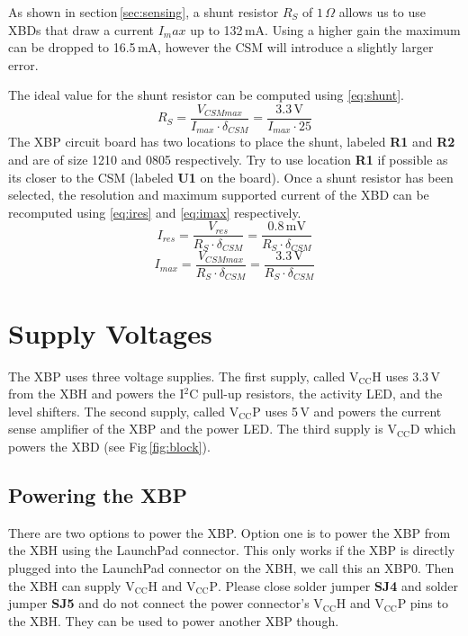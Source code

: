 \documentclass[twoside,11pt]{cergdoc}
\begin{document}
As shown in section\,\ref{sec:sensing}, a shunt resistor $R_S$ of $1\,\Omega$
allows us to use XBDs that draw a current $I_max$ up to 132\,mA. Using a higher 
gain the maximum can be dropped to 16.5\,mA, however the CSM will introduce a 
slightly larger error. 

The ideal value for the shunt resistor can be computed using \eqref{eq:shunt}.
%
\begin{equation}
  R_S = \frac{V_{CSMmax}}{I_{max} \cdot \delta_{CSM}} = \frac{3.3\,\mathrm{V}}{I_{max} \cdot 25}\label{eq:shunt}
\end{equation}
%
The XBP circuit board has two locations to place the shunt, labeled \textbf{R1} 
and \textbf{R2} and are of size 1210 and 0805 respectively. Try to use location 
\textbf{R1} if possible as its closer to the CSM (labeled \textbf{U1} on the board).
Once a shunt resistor has been selected, the resolution and maximum supported current of the XBD can be
recomputed using \eqref{eq:ires} and \eqref{eq:imax} respectively. 
%
\begin{equation}
  I_{res} = \frac{V_{res}}{R_S \cdot \delta_{CSM}} = \frac{0.8\,\mathrm{mV}}{R_S \cdot \delta_{CSM}}\label{eq:ires}
\end{equation}
\begin{equation}
  I_{max} = \frac{V_{CSMmax}}{R_S \cdot \delta_{CSM}} = \frac{3.3\,\mathrm{V}}{R_S \cdot \delta_{CSM}}\label{eq:imax}
\end{equation}

\section{Supply Voltages}
The XBP uses three voltage supplies. The first supply, called $\mathrm{V_{CC}H}$
uses 3.3\,V from the XBH and powers the I$^2$C pull-up resistors, the activity LED, 
and the level shifters.
The second supply, called $\mathrm{V_{CC}P}$ uses 5\,V and powers the current
sense amplifier of the XBP and the power LED. 
The third supply is $\mathrm{V_{CC}D}$ which powers the XBD (see Fig\,\ref{fig:block}).

\subsection{Powering the XBP}
There are two options to power the XBP. Option one is to power the XBP from the
XBH using the LaunchPad connector. This only works if the XBP is directly plugged into the 
LaunchPad connector on the XBH, 
we call this an XBP0. Then the XBH can supply $\mathrm{V_{CC}H}$ and $\mathrm{V_{CC}P}$.
Please close solder jumper \textbf{SJ4} and solder jumper \textbf{SJ5} and do not connect
the power connector's $\mathrm{V_{CC}H}$ and $\mathrm{V_{CC}P}$ pins to the XBH. 
They can be used to power another XBP though.
\end{document}
